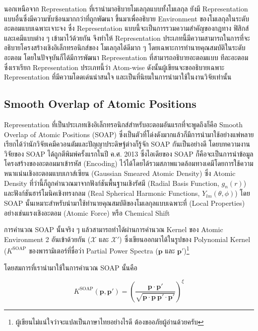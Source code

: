 นอกเหนือจาก Representation ที่เรานำมาอธิบายโมเลกุลแบบทั้งโมเลกุล ยังมี Representation แบบอื่นซึ่งมีความซับซ้อนมากกว่าที่ถูกพัฒนา%
ขึ้นมาเพื่ออธิบาย Environment ของโมเลกุลในระดับอะตอมแบบเฉพาะเจาะจง ซึ่ง Representation แบบนี้จะเป็นการรวมความสำคัญของกฎทาง%
ฟิสิกส์และเคมีแบบต่าง ๆ เข้ามาไว้ด้วยกัน จึงทำให้ Representation ประเภทนี้มีความสามารถในการที่จะอธิบายโครงสร้างเชิงอิเล็กทรอนิกส์ของ%
โมเลกุลได้ดีมาก ๆ โดยเฉพาะการทำนายคุณสมบัติในระดับอะตอม โดยในปัจจุบันก็ได้มีการพัฒนา Representation ที่สามารถอธิบายอะตอมแบบ%
ทีละอะตอม ซึ่งเราเรียก Representation ประเภทนี้ว่า Atom-wise ดังนั้นผู้เขียนจะขออธิบายเฉพาะ Representation ที่มีความโดดเด่นน่าสนใจ%
และเป็นที่นิยมในการนำมาใช้ในงานวิจัยเท่านั้น

\subsection{Smooth Overlap of Atomic Positions}
\label{ssec:soap}

Representation ที่เป็นประเภทเชิงอิเล็กทรอนิกส์สำหรับอะตอมอันแรกที่จะพูดถึงก็คือ Smooth Overlap of Atomic Positions (SOAP) 
ซึ่งเป็นตัวที่โด่งดังมากแล้วก็มีการนำมาใช้อย่างแพ่หลาย เรียกได้ว่านักวิจัยเคมีควอนตัมและปัญญาประดิษฐ์ต่างก็รู้จัก SOAP กันเป็นอย่างดี
โดยบทความงานวิจัยของ SOAP ได้ถูกตีพิมพ์ครั้งแรกในปี ค.ศ. 2013 ซึ่งไอเดียของ SOAP ก็คือจะเป็นการนำข้อมูลโครงสร้างของอะตอมมาเข้ารหัส 
(Encoding) ไว้ได้โดยได้รวมสภาพแวดล้อมทางเคมีโดยการใช้ความหนาแน่นเชิงอะตอมแบบเกาส์เซียน (Gaussian Smeared Atomic Density) 
ซึ่ง Atomic Density ที่ว่านี้ก็ถูกคำนวณมาจากฟังก์ชันพื้นฐานเชิงรัศมี (Radial Basis Function, $g_{n}(r)$) และฟังก์ชันฮาร์โมนิคเชิงทรงกลม 
(Real Spherical Harmonic Functions, $Y_{lm}(\theta, \phi)$)\autocite{bartok2013,de2016}
โดย SOAP นั้นเหมาะสำหรับนำมาใช้ทำนายคุณสมบัติของโมเลกุลแบบเฉพาะที่ (Local Properties) อย่างเช่นแรงเชิงอะตอม (Atomic Force) 
หรือ Chemical Shift

การคำนวณ SOAP นั้นจริง ๆ แล้วสามารถทำได้ผ่านการคำนวณ Kernel ของ Atomic Environment 2 อันเข้าด้วยกัน ($\mathcal{X}$ และ 
$\mathcal{X}'$) ซึ่งเขียนออกมาได้ในรูปของ Polynomial Kernel ($K^\mathrm{SOAP}$ ของพารามิเตอร์ที่ชื่อว่า Partial Power 
Spectra ($\mathbf{p}$ และ $\mathbf{p}'$)\footnote{ผู้เขียนไม่แน่ใจว่าจะแปลเป็นภาษาไทยอย่างไรดี ต้องขออภัยผู้อ่านด้วยครับ} 

โดยสมการที่เรานำมาใช้ในการคำนวณ SOAP นั้นคือ

\begin{equation}\label{eq:soap}
    K^\mathrm{SOAP}(\mathbf{p}, \mathbf{p'}) = \left( \frac{\mathbf{p} \cdot \mathbf{p'}}{\sqrt{\mathbf{p} 
    \cdot \mathbf{p}~\mathbf{p'} \cdot \mathbf{p'}}}\right)^{\xi}
\end{equation}

